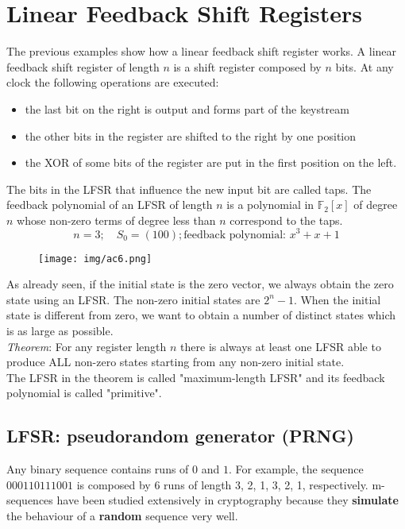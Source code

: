 \documentclass[a4paper, 10pt, titlepage]{article}
\begin{document}
\section{Linear Feedback Shift Registers}
The previous examples show how a linear feedback shift register works.
A linear feedback shift register of length $n$ is a shift register
composed by $n$ bits.
At any clock the following operations are executed:
\begin{itemize}
\item the last bit on the right is output and forms part of the keystream
\item the other bits in the register are shifted to the right by one position
\item the XOR of some bits of the register are put in the first position on
the left.
\end{itemize}
The bits in the LFSR that influence the new input bit are called taps. The feedback polynomial of an LFSR of length $n$ is a polynomial in $\mathbb{F}_2[x]$ of degree $n$ whose non-zero terms of degree less than $n$ correspond to the taps.
$$n=3; \quad S_0 = (100); \text{feedback polynomial: }x^3 + x + 1$$
\begin{figure}[h]
\centering
\texttt{[image: img/ac6.png]}
\end{figure}
As already seen, if the initial state is the zero vector, we always obtain the zero state using an LFSR.
The non-zero initial states are $2^n - 1$. When the initial state is different from zero, we want to obtain a number of distinct states which is as large as possible.  \\
\textit{Theorem}: For any register length $n$ there is always at least one LFSR able to produce ALL non-zero states starting from any non-zero initial state. \\
The LFSR in the theorem is called "maximum-length LFSR" and its  feedback polynomial is called "primitive". 
\subsection{LFSR: pseudorandom generator (PRNG)}
Any binary sequence contains runs of $0$ and $1$. For example, the sequence $000110111001$ is composed by 6 runs of length 3, 2, 1, 3, 2, 1, respectively. m-sequences have been studied extensively in cryptography because they \textbf{simulate} the behaviour of a \textbf{random} sequence very well.
\end{document}
